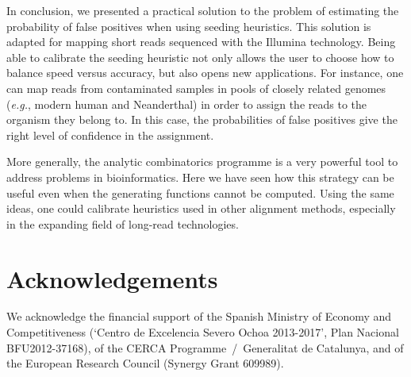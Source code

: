 \documentclass{article}
\begin{document}
In conclusion, we presented a practical solution to the problem of
estimating the probability of false positives when using seeding
heuristics. This solution is adapted for mapping short reads sequenced
with the Illumina technology. Being able to calibrate the seeding
heuristic not only allows the user to choose how to balance speed versus
accuracy, but also opens new applications. For instance, one can map reads
from contaminated samples in pools of closely related genomes
(\textit{e.g.}, modern human and Neanderthal) in order to assign the reads
to the organism they belong to. In this case, the probabilities of false
positives give the right level of confidence in the assignment.

More generally, the analytic combinatorics programme is a very powerful
tool to address problems in bioinformatics. Here we have seen how this
strategy can be useful even when the generating functions cannot be
computed. Using the same ideas, one could calibrate heuristics used in
other alignment methods, especially in the expanding field of long-read
technologies.


\section*{Acknowledgements}

We acknowledge the financial support of the Spanish Ministry of Economy and
Competitiveness (‘Centro de Excelencia Severo Ochoa 2013-2017’, Plan Nacional
BFU2012-37168), of the CERCA Programme~/~Generalitat de Catalunya, and of the
European Research Council (Synergy Grant 609989).






\end{document}
